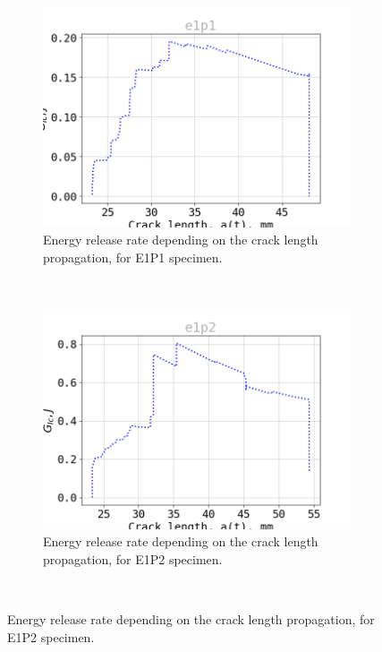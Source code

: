 \begin{figure}[H]
\centering
\begin{subfigure}{0.48\linewidth}
	\centering
	\includegraphics[scale=0.3]{Figures/e1p1_G}
	\decoRule
	\caption[Energy release rate E1P1]{Energy release rate depending on the crack length propagation, for E1P1 specimen.}
	\label{fig:E1P1_G}
\end{subfigure}
\hfill\\
\begin{subfigure}{0.48\linewidth}
	\centering
	\includegraphics[scale=0.3]{Figures/e1p2_G}
	\decoRule
	\caption[Energy release rate E1P2]{Energy release rate depending on the crack length propagation, for E1P2 specimen.}
	\label{fig:E1P2_G}
\end{subfigure}
\hfill\\

\end{figure}
